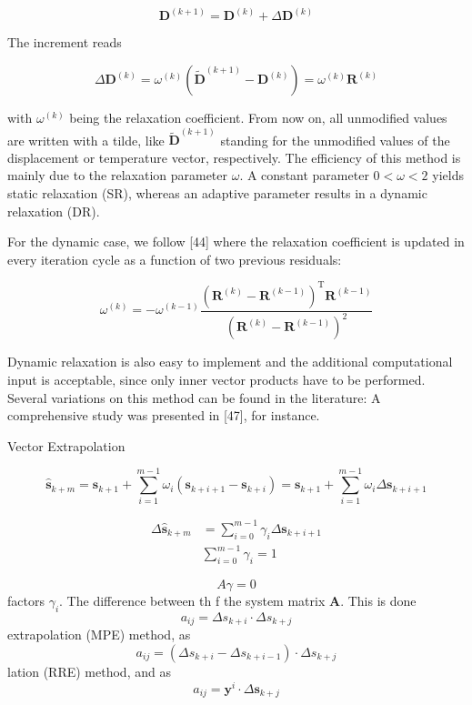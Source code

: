 $$
\mathbf{D}^{(k+1)}=\mathbf{D}^{(k)}+\Delta \mathbf{D}^{(k)}
$$

The increment reads

$$
\Delta \mathbf{D}^{(k)}=\omega^{(k)}\left(\tilde{\mathbf{D}}^{(k+1)}-\mathbf{D}^{(k)}\right)=\omega^{(k)} \mathbf{R}^{(k)}
$$

with $\omega^{(k)}$ being the relaxation coefficient. From now on, all unmodified values are written with a tilde, like $\tilde{\mathbf{D}}^{(k+1)}$ standing for the unmodified values of the displacement or temperature vector, respectively. The efficiency of this method is mainly due to the relaxation parameter $\omega$. A constant parameter $0<\omega<2$ yields static relaxation (SR), whereas an adaptive parameter results in a dynamic relaxation (DR).

For the dynamic case, we follow [44] where the relaxation coefficient is updated in every iteration cycle as a function of two previous residuals:

$$
\omega^{(k)}=-\omega^{(k-1)} \frac{\left(\mathbf{R}^{(k)}-\mathbf{R}^{(k-1)}\right)^{\mathrm{T}} \mathbf{R}^{(k-1)}}{\left(\mathbf{R}^{(k)}-\mathbf{R}^{(k-1)}\right)^{2}}
$$

Dynamic relaxation is also easy to implement and the additional computational input is acceptable, since only inner vector products have to be performed. Several variations on this method can be found in the literature: A comprehensive study was presented in [47], for instance.

 Vector Extrapolation

$$
\hat{\boldsymbol{s}}_{k+m}=\boldsymbol{s}_{k+1}+\sum_{i=1}^{m-1} \omega_{i}\left(\boldsymbol{s}_{k+i+1}-\boldsymbol{s}_{k+i}\right)=\boldsymbol{s}_{k+1}+\sum_{i=1}^{m-1} \omega_{i} \Delta \boldsymbol{s}_{k+i+1}
$$

$$
\begin{aligned}\Delta \hat{\boldsymbol{s}}_{k+m} &=\sum_{i=0}^{m-1} \gamma_{i} \Delta \boldsymbol{s}_{k+i+1} \\& \sum_{i=0}^{m-1} \gamma_{i}=1\end{aligned}
$$

\[
A \gamma=0
\]
factors \(\gamma_{i}\). The difference between th f the system matrix \(\boldsymbol{A}\). This is done
\[
a_{i j}=\Delta s_{k+i} \cdot \Delta s_{k+j}
\]
extrapolation (MPE) method, as
\[
a_{i j}=\left(\Delta s_{k+i}-\Delta s_{k+i-1}\right) \cdot \Delta s_{k+j}
\]
lation (RRE) method, and as
\[
a_{i j}=\boldsymbol{y}^{i} \cdot \Delta \boldsymbol{s}_{k+j}
\]

